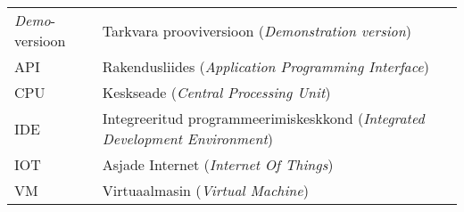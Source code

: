 \begin{longtable}{p{3cm}p{10cm}}
\textit{Demo}-versioon&Tarkvara prooviversioon (\emph{Demonstration version})\\

API&Rakendusliides (\emph{Application Programming Interface})\\
CPU&Keskseade (\emph{Central Processing Unit})\\
IDE&Integreeritud programmeerimiskeskkond (\emph{Integrated Development Environment})\\
IOT&Asjade Internet (\emph{Internet Of Things})\\
VM&Virtuaalmasin (\emph{Virtual Machine})\\
\end{longtable}
\addtocounter{table}{-1} 